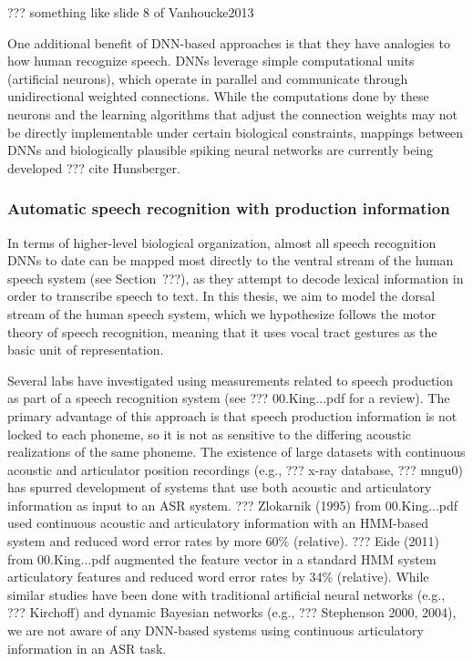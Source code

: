 ??? something like slide 8 of Vanhoucke2013

One additional benefit of DNN-based approaches
is that they have analogies to
how human recognize speech.
DNNs leverage simple computational units
(artificial neurons),
which operate in parallel
and communicate through unidirectional
weighted connections.
While the computations done by these neurons
and the learning algorithms that adjust
the connection weights
may not be directly implementable
under certain biological constraints,
mappings between DNNs
and biologically plausible spiking neural networks
are currently being developed
??? cite Hunsberger.

\subsubsection{Automatic speech recognition with production information}

In terms of higher-level biological organization,
almost all speech recognition DNNs to date
can be mapped most directly
to the ventral stream of the human speech system
(see Section~???),
as they attempt to decode
lexical information in order to
transcribe speech to text.
In this thesis, we aim to model
the dorsal stream of the human speech system,
which we hypothesize follows the
motor theory of speech recognition,
meaning that it uses vocal tract gestures
as the basic unit of representation.

Several labs have investigated
using measurements
related to speech production
as part of a speech recognition system
(see ??? 00.King...pdf for a review).
The primary advantage of this approach
is that speech production information
is not locked to each phoneme,
so it is not as sensitive to the
differing acoustic realizations
of the same phoneme.
The existence of large datasets
with continuous acoustic
and articulator position recordings
(e.g., ??? x-ray database, ??? mngu0)
has spurred development of
systems that use both
acoustic and articulatory information
as input to an ASR system.
??? Zlokarnik (1995) from 00.King...pdf
used continuous acoustic and articulatory
information with an HMM-based system
and reduced word error rates
by more 60\% (relative).
??? Eide (2011) from 00.King...pdf
augmented the feature vector
in a standard HMM system
articulatory features and
reduced word error rates
by 34\% (relative).
While similar studies have been done
with traditional artificial neural networks
(e.g., ??? Kirchoff)
and dynamic Bayesian networks
(e.g., ??? Stephenson 2000, 2004),
we are not aware of
any DNN-based systems using
continuous articulatory
information in an ASR task.

